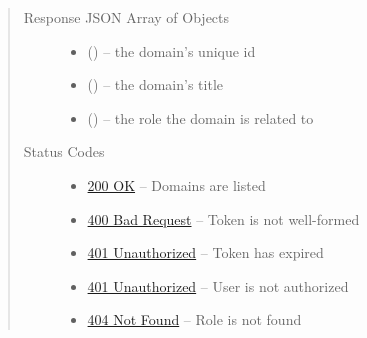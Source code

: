 \documentclass[letterpaper,10pt,english]{sphinxmanual}
\begin{document}
\begin{fulllineitems}
\begin{quote}
\begin{description}
\begin{itemize}
\end{itemize}

\item[{Response JSON Array of Objects}] \leavevmode\begin{itemize}
\item {} 
 () -- the domain's unique id

\item {} 
 () -- the domain's title

\item {} 
 () -- the role the domain is related to

\end{itemize}

\item[{Status Codes}] \leavevmode\begin{itemize}
\item {} 
\href{http://www.w3.org/Protocols/rfc2616/rfc2616-sec10.html\#sec10.2.1}{200 OK} -- Domains are listed

\item {} 
\href{http://www.w3.org/Protocols/rfc2616/rfc2616-sec10.html\#sec10.4.1}{400 Bad Request} -- Token is not well-formed

\item {} 
\href{http://www.w3.org/Protocols/rfc2616/rfc2616-sec10.html\#sec10.4.2}{401 Unauthorized} -- Token has expired

\item {} 
\href{http://www.w3.org/Protocols/rfc2616/rfc2616-sec10.html\#sec10.4.2}{401 Unauthorized} -- User is not authorized

\item {} 
\href{http://www.w3.org/Protocols/rfc2616/rfc2616-sec10.html\#sec10.4.5}{404 Not Found} -- Role is not found

\end{itemize}

\end{description}\end{quote}

\end{fulllineitems}
\end{document}
